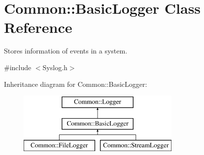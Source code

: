 \hypertarget{class_common_1_1_basic_logger}{\section{Common\-:\-:Basic\-Logger Class Reference}
\label{class_common_1_1_basic_logger}
}


Stores information of events in a system.  




{\ttfamily \#include $<$Syslog.\-h$>$}

Inheritance diagram for Common\-:\-:Basic\-Logger\-:\begin{figure}[H]
\begin{center}
\leavevmode
\includegraphics[height=3.000000cm]{class_common_1_1_basic_logger}
\end{center}
\end{figure}
